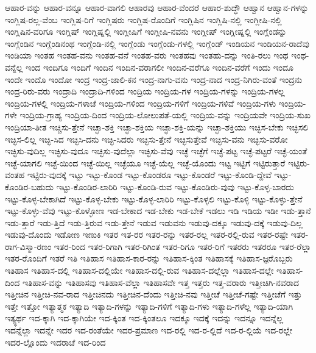 {ಆಹಾರ-ವನ್ನು
ಆಹಾರ-ವನ್ನೂ
ಆಹಾರ-ವಾಗಲಿ
ಆಹಾರವು
ಆಹಾರ-ವೆಂದರೆ
ಆಹಾರ-ಶುದ್ಧೌ
ಆಹ್ವಾನ
ಆಹ್ವಾನ-ಗಳನ್ನು
ಇಂಗ್ಲಿಷ-ರಲ್ಲ-ವೆಂಬ
ಇಂಗ್ಲಿಷ-ರಿಗೆ
ಇಂಗ್ಲಿಷರು
ಇಂಗ್ಲಿಷ-ರೊಂದಿಗೆ
ಇಂಗ್ಲಿಷಿನ
ಇಂಗ್ಲಿಷಿ-ನಲ್ಲಿ
ಇಂಗ್ಲೀಷಿ-ನಲ್ಲಿ
ಇಂಗ್ಲಿಷಿನ-ವರಿಗೂ
ಇಂಗ್ಲಿಷ್
ಇಂಗ್ಲಿಷ್ನಲ್ಲಿ
ಇಂಗ್ಲೀಷಿಗೆ
ಇಂಗ್ಲೀಷಿ-ನವನು
ಇಂಗ್ಲೀಷ್
ಇಂಗ್ಲೀಷ್ನಲ್ಲಿ
ಇಂಗ್ಲೆಂಡನ್ನು
ಇಂಗ್ಲೆಂಡಿನ
ಇಂಗ್ಲೆಂಡಿನಂಥ
ಇಂಗ್ಲೆಂಡಿ-ನಲ್ಲಿ
ಇಂಗ್ಲೆಂಡು
ಇಂಗ್ಲೆಂಡು-ಗಳಲ್ಲಿ
ಇಂಗ್ಲೆಂಡ್
ಇಂಡಿಯನ
ಇಂಡಿಯನ-ರಾದೆವು
ಇಂಡಿಯಾ
ಇಂತಹ
ಇಂತಹ-ವನು
ಇಂತಹ-ವನೆ
ಇಂತಹ-ವರು
ಇಂತಹವು
ಇಂತಹು-ದನ್ನು
ಇಂತಿ-ರಲು
ಇಂಥ
ಇಂಥ-ವನ್ನೆಲ್ಲ
ಇಂದ
ಇಂದಿಗೂ
ಇಂದಿಗೆ
ಇಂದಿನ
ಇಂದಿನ-ವರಾಗಲೀ
ಇಂದಿನ-ವರೆಗೂ
ಇಂದಿನ-ವರೆಗೆ
ಇಂದು
ಇಂದೂ
ಇಂದೇ
ಇಂದೊ
ಇಂದೋ
ಇಂದ್ರ
ಇಂದ್ರ-ಜಾಲಿ-ಕನ
ಇಂದ್ರ-ನಾಗು-ವನು
ಇಂದ್ರ-ನಾದ
ಇಂದ್ರ-ನಿಗಿರು-ವಂತೆ
ಇಂದ್ರನು
ಇಂದ್ರ-ರಿರು-ವರು
ಇಂದ್ರಾದಿ
ಇಂದ್ರಾದಿ-ಗಳಿಂದ
ಇಂದ್ರಿಯ
ಇಂದ್ರಿಯ-ಗಳ
ಇಂದ್ರಿಯ-ಗಳನ್ನು
ಇಂದ್ರಿಯ-ಗಳಲ್ಲ
ಇಂದ್ರಿಯ-ಗಳಲ್ಲಿ
ಇಂದ್ರಿಯ-ಗಳಾಚೆ
ಇಂದ್ರಿಯ-ಗಳಿಂದ
ಇಂದ್ರಿಯ-ಗಳಿಗೆ
ಇಂದ್ರಿಯ-ಗಳಿವೆ
ಇಂದ್ರಿಯ-ಗಳು
ಇಂದ್ರಿಯ-ಗಳೇ
ಇಂದ್ರಿಯ-ಗ್ರಾಹ್ಯ
ಇಂದ್ರಿಯ-ದಿಂದ
ಇಂದ್ರಿಯ-ಲೋಲುಪತೆ-ಯಲ್ಲಿ
ಇಂದ್ರಿಯ-ವನ್ನು
ಇಂದ್ರಿಯವೇ
ಇಂದ್ರಿಯ-ಸುಖ
ಇಂದ್ರಿಯಾ-ತೀತ
ಇಚ್ಚಿಸು-ತ್ತೇನೆ
ಇಚ್ಛಾ-ಶಕ್ತಿ
ಇಚ್ಛಾ-ಶಕ್ತಿಯ
ಇಚ್ಛಾ-ಶಕ್ತಿ-ಯನ್ನು
ಇಚ್ಛಾ-ಶಕ್ತಿಯು
ಇಚ್ಛಿಸ-ಬೇಕು
ಇಚ್ಛಿಸಲಿ
ಇಚ್ಛಿಸ-ಲಿಲ್ಲ
ಇಚ್ಛಿ-ಸಿದ
ಇಚ್ಛಿಸಿ-ದನು
ಇಚ್ಛಿ-ಸಿದರು
ಇಚ್ಛಿಸು-ತ್ತೇನೆ
ಇಚ್ಛಿಸುತ್ತೇವೆ
ಇಚ್ಛಿಸು-ವನು
ಇಚ್ಛಿಸು-ವರೋ
ಇಚ್ಛಿಸು-ವುದಿಲ್ಲ
ಇಚ್ಛಿಸು-ವುದೂ
ಇಚ್ಛಿಸು-ವುದೆಲ್ಲಾ
ಇಚ್ಛಿಸು-ವೆವು
ಇಚ್ಛೆ
ಇಚ್ಛೆಗೆ
ಇಚ್ಛೆ-ಪಟ್ಟ
ಇಚ್ಛೆ-ಪಟ್ಟರೆ
ಇಚ್ಛೆ-ಯಂತೆ
ಇಚ್ಛೆ-ಯಾಗಲಿ
ಇಚ್ಛೆ-ಯಿಂದ
ಇಚ್ಛೆ-ಯಿಲ್ಲ
ಇಚ್ಛೆಯೂ
ಇಚ್ಛೆ-ಯೆಲ್ಲ
ಇಚ್ಛೆ-ಯೊಂದು
ಇಟ್ಟ
ಇಟ್ಟಿಗೆ
ಇಟ್ಟಿರುತ್ತಾರೆ
ಇಟ್ಟಿರು-ವಂತಹ
ಇಟ್ಟಿರು-ವುದಕ್ಕೆ
ಇಟ್ಟು
ಇಟ್ಟು-ಕೊಂಡ
ಇಟ್ಟು-ಕೊಂಡರೂ
ಇಟ್ಟು-ಕೊಂಡರೆ
ಇಟ್ಟು-ಕೊಂಡಿ-ದ್ದೇವೆ
ಇಟ್ಟು-ಕೊಂಡಿರ-ಬಹುದು
ಇಟ್ಟು-ಕೊಂಡಿರ-ಲಾರಿರಿ
ಇಟ್ಟು-ಕೊಂಡಿ-ರುವ
ಇಟ್ಟು-ಕೊಂಡಿರು-ವುವು
ಇಟ್ಟು-ಕೊಳ್ಳ-ಬಾರದು
ಇಟ್ಟು-ಕೊಳ್ಳ-ಬೇಕಾಗಿದೆ
ಇಟ್ಟು-ಕೊಳ್ಳ-ಬೇಕು
ಇಟ್ಟು-ಕೊಳ್ಳ-ಲಾರಿರಿ
ಇಟ್ಟು-ಕೊಳ್ಳಲಿ
ಇಟ್ಟು-ಕೊಳ್ಳಿ
ಇಟ್ಟು-ಕೊಳ್ಳು-ತ್ತೇನೆ
ಇಟ್ಟು-ಕೊಳ್ಳು-ವೆವು
ಇಟ್ಟು-ಕೊಳ್ಳೋಣ
ಇಡ-ಬೇಕಾದ
ಇಡ-ಬೇಕು
ಇಡ-ಬೇಕೆ
ಇಡಲು
ಇಡಿ
ಇಡಿಯ
ಇಡೀ
ಇಡು-ತ್ತಾನೆ
ಇಡು-ತ್ತಾರೆ
ಇಡು-ತ್ತಿದೆ
ಇಡು-ತ್ತಿರುವ
ಇಡು-ತ್ತೇನೆ
ಇಡುವ
ಇಡುವನು
ಇಡುವು-ದಕ್ಕೂ
ಇಡುವು-ದಕ್ಕೆ
ಇಡುವು-ದಿಲ್ಲ
ಇಡುವು-ದೊಂದು
ಇಡೋಣ
ಇಣುಕಿ
ಇತರ
ಇತ-ರರ
ಇತರ-ರನ್ನು
ಇತರ-ರಲ್ಲ
ಇತರ-ರಲ್ಲಿ-ರುವ
ಇತರ-ರಷ್ಟೇ
ಇತರ-ರಾಗ-ವಿಸ್ಮಾ-ರಣಂ
ಇತರ-ರಿಂದ
ಇತರ-ರಿಗಾಗಿ
ಇತರ-ರಿಗಿಂತ
ಇತರ-ರಿಗೂ
ಇತರ-ರಿಗೆ
ಇತರರು
ಇತರರೂ
ಇತರ-ರೆಲ್ಲಾ
ಇತರ-ರೊಂದಿಗೆ
ಇತರೆ
ಇತಿ
ಇತಿಹಾಸ
ಇತಿಹಾಸ-ಕಾರ-ರನ್ನು
ಇತಿಹಾಸ-ಕ್ಕಿಂತ
ಇತಿಹಾಸಕ್ಕೆ
ಇತಿಹಾಸ-ಜ್ಞರೊಬ್ಬರು
ಇತಿಹಾಸ
ಇತಿಹಾಸ-ದಲ್ಲಿ
ಇತಿಹಾಸ-ದಲ್ಲಿಯೇ
ಇತಿಹಾಸ-ದಲ್ಲಿ-ರುವ
ಇತಿಹಾಸ-ದಲ್ಲೆಲ್ಲಾ
ಇತಿಹಾಸ-ದಲ್ಲೇ
ಇತಿಹಾಸ-ದಿಂದ
ಇತಿಹಾಸ-ವನ್ನು
ಇತಿಹಾಸವು
ಇತಿಹಾಸ-ವೆಲ್ಲಾ
ಇತಿಹಾಸವೇ
ಇತ್ತ
ಇತ್ತರು
ಇತ್ತ-ವರಾರು
ಇತ್ತೀಚಿಗಿ-ನವರಾದ
ಇತ್ತೀಚಿನ
ಇತ್ತೀಚಿ-ನವ-ರಾದ
ಇತ್ತೀಚಿನದು
ಇತ್ತೀಚಿನ-ದೆಂದು
ಇತ್ತೀಚಿ-ನವು
ಇತ್ತೀಚೆ
ಇತ್ತೀಚೆ-ಗಷ್ಟೇ
ಇತ್ತೀಚೆಗೆ
ಇತ್ತು
ಇತ್ತೇ
ಇತ್ತೋ
ಇತ್ಯಾತ್ಮಕ
ಇತ್ಯಾದಿ
ಇತ್ಯಾದಿ-ಗಳನ್ನು
ಇತ್ಯಾದಿ-ಗಳಿಗೆ
ಇತ್ಯಾದಿ-ಗಳು
ಇತ್ಯಾದಿ-ಗಳೆಲ್ಲ
ಇತ್ಯಾದಿ-ಯಾಗಿ
ಇತ್ಯ್ಧರ್ಥ
ಇದ-ಕ್ಕಾಗಿ
ಇದ-ಕ್ಕಾಗಿಯೇ
ಇದ-ಕ್ಕಿಂತ
ಇದ-ಕ್ಕಿಂತಲೂ
ಇದಕ್ಕೂ
ಇದಕ್ಕೆ
ಇದನ್ನು
ಇದನ್ನೂ
ಇದನ್ನೆಲ್ಲ
ಇದನ್ನೆಲ್ಲಾ
ಇದನ್ನೇ
ಇದರ
ಇದ-ರಂತೆಯೇ
ಇದರ-ಪ್ರಮಾಣ
ಇದ-ರಲ್ಲಿ
ಇದ-ರ-ಲ್ಲಿದೆ
ಇದ-ರ-ಲ್ಲಿಯೆ
ಇದ-ರಲ್ಲೇ
ಇದರ-ಲ್ಲೊಂದು
ಇದರಾಚೆ
ಇದ-ರಿಂದ
}
